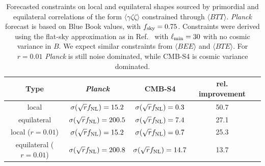 \begin{table}[t]
  \begin{center}
    \begin{tabular}{ | c || c | c | c | c |}
      \hline
      Type & {\it Planck} & CMB-S4 & rel. improvement  \\ \hline \hline
      local & $\sigma(\sqrt{r}f_{\rm NL}) = 15.2$ & $\sigma(\sqrt{r}f_{\rm NL}) = 0.3$ & 50.7\\ \hline 
      equilateral &  $\sigma(\sqrt{r}f_{\rm NL}) = 200.5$ & $\sigma(\sqrt{r}f_{\rm NL}) = 7.4$ & 27.1\\ \hline 
      local ($r = 0.01$) & $\sigma(\sqrt{r}f_{\rm NL}) = 15.2$ & $\sigma(\sqrt{r}f_{\rm NL}) = 0.7$ & 25.3\\ \hline 
      equilateral ($r = 0.01$) &  $\sigma(\sqrt{r}f_{\rm NL}) = 200.8$ & $\sigma(\sqrt{r}f_{\rm NL}) = 14.7$ & 13.7\\ \hline 
    \end{tabular}
  \end{center}
  \caption{Forecasted constraints on local and equilateral shapes sourced by primordial and equilateral correlations of the form $\langle \gamma \zeta\zeta \rangle$ constrained through $\langle BTT \rangle$. {\it Planck\/} forecast is based on Blue Book values, with $f_{\rm sky} = 0.75$. Constraints were derived using the flat-sky approximation as in Ref.~\cite{Meerburg:2016ecv} with $\ell_{\rm min} = 30$ with no cosmic variance in $B$.  We expect similar constraints from $\langle BEE \rangle$ and $\langle BTE \rangle$. For $r = 0.01$ {\it Planck\/} is still noise dominated, while CMB-S4 is cosmic variance dominated. }
\label{tab:fnl_forecast2}
\end{table}



